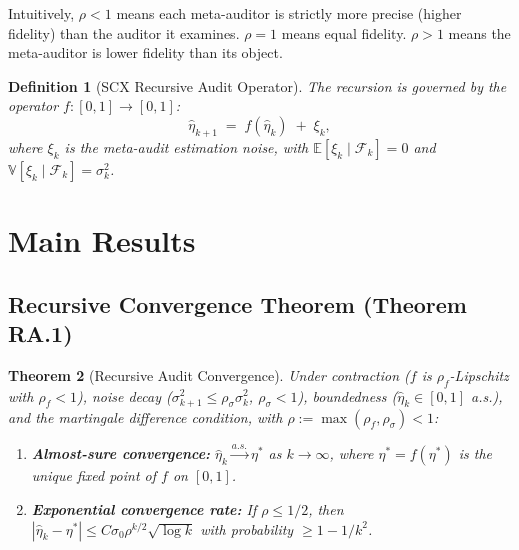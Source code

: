 \documentclass[12pt,a4paper]{article}
\newtheorem{theorem}{Theorem}[section]
\newtheorem{definition}[theorem]{Definition}
\newcommand{\E}{\mathbb{E}}
\newcommand{\V}{\mathbb{V}}
\newcommand{\cF}{\mathcal{F}}
\begin{document}
Intuitively, $\rho<1$ means each meta-auditor is strictly more precise (higher fidelity) than the auditor it examines. $\rho=1$ means equal fidelity. $\rho>1$ means the meta-auditor is lower fidelity than its object.

\begin{definition}[SCX Recursive Audit Operator]
\label{def:operator}
The recursion is governed by the operator $f:[0,1]\to[0,1]$:
\begin{equation}\label{eq:f-operator}
    \hat{\eta}_{k+1} \;=\; f(\hat{\eta}_k) \;+\; \xi_k,
\end{equation}
where $\xi_k$ is the meta-audit estimation noise, with $\E[\xi_k\mid\cF_k]=0$ and $\V[\xi_k\mid\cF_k]=\sigma_k^2$.
\end{definition}

\section{Main Results}

\subsection{Recursive Convergence Theorem (Theorem RA.1)}

\begin{theorem}[Recursive Audit Convergence]
\label{thm:convergence}
Under contraction ($f$ is $\rho_f$-Lipschitz with $\rho_f<1$), noise decay ($\sigma_{k+1}^2 \leq \rho_\sigma \sigma_k^2$, $\rho_\sigma<1$), boundedness ($\hat{\eta}_k\in[0,1]$ a.s.), and the martingale difference condition, with $\rho:=\max(\rho_f,\rho_\sigma)<1$:
\begin{enumerate}[label=(\roman*)]
    \item \textbf{Almost-sure convergence:} $\hat{\eta}_k\xrightarrow{a.s.}\eta^*$ as $k\to\infty$, where $\eta^*=f(\eta^*)$ is the unique fixed point of $f$ on $[0,1]$.
    \item \textbf{Exponential convergence rate:} If $\rho\leq1/2$, then $|\hat{\eta}_k-\eta^*| \leq C\sigma_0\rho^{k/2}\sqrt{\log k}$ with probability $\geq 1-1/k^2$.
\end{enumerate}
\end{theorem}
\end{document}
